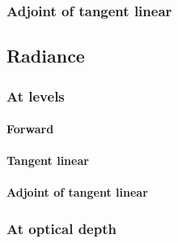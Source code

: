 %
\subsubsection{Adjoint of tangent linear}
\label{sec:dom-adjoint_of_tangent_linear}


%
\subsection{Radiance}
\label{sec:dom-radiance}


\subsubsection{At levels}
\label{sec:dom-radiance_at_levels}


\paragraph{Forward}
\label{sec:dom-radiance_at_levels-forward}


%
\paragraph{Tangent linear}
\label{sec:dom-radiance_at_levels-tangent_linear}


%
\paragraph{Adjoint of tangent linear}
\label{sec:dom-radiance_at_levels-adjoint_of_tangent_linear}


%
\subsubsection{At optical depth}
\label{sec:dom-radiance_at_optical_depth}


